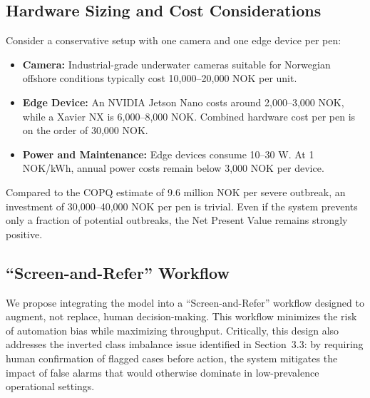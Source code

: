 \documentclass[12pt,a4paper]{article}
\begin{document}
\subsection{Hardware Sizing and Cost Considerations}
Consider a conservative setup with one camera and one edge device per pen:
\begin{itemize}
    \item \textbf{Camera:} Industrial-grade underwater cameras suitable for Norwegian offshore conditions typically cost 10,000--20,000 NOK per unit.
    \item \textbf{Edge Device:} An NVIDIA Jetson Nano costs around 2,000--3,000 NOK, while a Xavier NX is 6,000--8,000 NOK. Combined hardware cost per pen is on the order of 30,000 NOK.
    \item \textbf{Power and Maintenance:} Edge devices consume 10--30 W. At 1 NOK/kWh, annual power costs remain below 3,000 NOK per device.
\end{itemize}
Compared to the COPQ estimate of 9.6 million NOK per severe outbreak, an investment of 30,000--40,000 NOK per pen is trivial. Even if the system prevents only a fraction of potential outbreaks, the Net Present Value remains strongly positive.

\subsection{``Screen-and-Refer'' Workflow}
We propose integrating the model into a ``Screen-and-Refer'' workflow designed to augment, not replace, human decision-making. This workflow minimizes the risk of automation bias while maximizing throughput. Critically, this design also addresses the inverted class imbalance issue identified in Section~3.3: by requiring human confirmation of flagged cases before action, the system mitigates the impact of false alarms that would otherwise dominate in low-prevalence operational settings.
\end{document}
